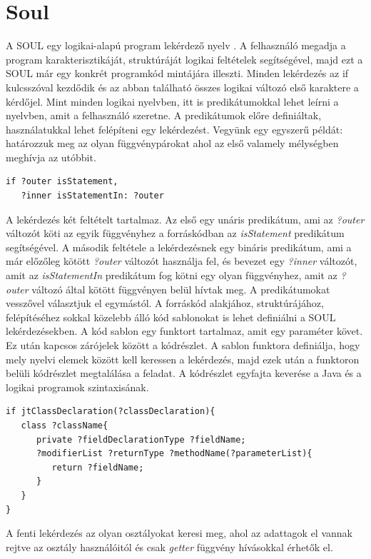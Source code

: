 \documentclass[a4paper,12pt]{report}
\begin{document}
\section{Soul}
\par A SOUL egy logikai-alapú program lekérdező nyelv \cite{soul}. A felhasználó megadja a program karakterisztikáját, struktúráját logikai feltételek segítségével, majd ezt a SOUL már egy konkrét programkód mintájára illeszti.
Minden lekérdezés az if kulcsszóval kezdődik és az abban található összes logikai változó első karaktere a kérdőjel. Mint minden logikai nyelvben, itt is predikátumokkal lehet leírni a nyelvben, amit a felhasználó szeretne. A predikátumok előre definiáltak, használatukkal lehet felépíteni egy lekérdezést. Vegyünk egy egyszerű példát: határozzuk meg az olyan függvénypárokat ahol az első valamely mélységben meghívja az utóbbit.
\begin{verbatim}
if ?outer isStatement, 
   ?inner isStatementIn: ?outer
\end{verbatim}
\par A lekérdezés két feltételt tartalmaz. Az első egy unáris predikátum, ami az \textit{?outer} változót köti az egyik függvényhez a forráskódban az \textit{isStatement} predikátum segítségével. A második feltétele a lekérdezésnek egy bináris predikátum, ami a már előzőleg kötött \textit{?outer} változót használja fel, és bevezet egy \textit{?inner} változót, amit az \textit{isStatementIn} predikátum fog kötni egy olyan függvényhez, amit az \textit{?outer} változó által kötött függvényen belül hívtak meg. A predikátumokat vesszővel választjuk el egymástól. A forráskód alakjához, struktúrájához, felépítéséhez sokkal közelebb álló kód sablonokat is lehet definiálni a SOUL lekérdezésekben. A kód sablon egy funktort tartalmaz, amit egy paraméter követ. Ez után kapcsos zárójelek között a kódrészlet. A sablon funktora definiálja, hogy mely nyelvi elemek között kell keressen a lekérdezés, majd ezek után a funktoron belüli kódrészlet megtalálása a feladat. A kódrészlet egyfajta keverése a Java és a logikai programok szintaxisának.
\begin{verbatim}
if jtClassDeclaration(?classDeclaration){
   class ?className{
      private ?fieldDeclarationType ?fieldName;
      ?modifierList ?returnType ?methodName(?parameterList){
         return ?fieldName;
      }
   }
}
\end{verbatim}
A fenti lekérdezés az olyan osztályokat keresi meg, ahol az adattagok el vannak rejtve az osztály használóitól és csak \textit{getter} függvény hívásokkal érhetők el.
\end{document}

